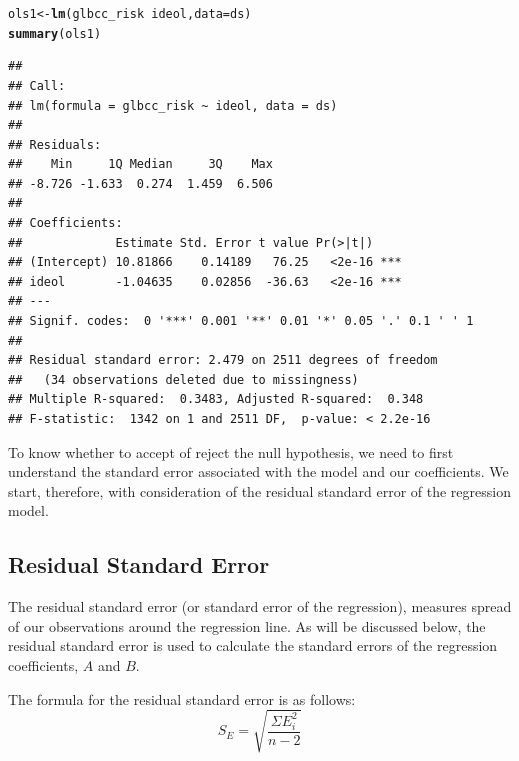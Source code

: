 \documentclass[11pt,openany]{book}\usepackage[]{graphicx}\usepackage[]{color}
\makeatletter
\newcommand{\hlopt}[1]{\textcolor[rgb]{0,0,0}{#1}}%
\newcommand{\hlstd}[1]{\textcolor[rgb]{0.345,0.345,0.345}{#1}}%
\newcommand{\hlkwb}[1]{\textcolor[rgb]{0.69,0.353,0.396}{#1}}%
\newcommand{\hlkwc}[1]{\textcolor[rgb]{0.333,0.667,0.333}{#1}}%
\newcommand{\hlkwd}[1]{\textcolor[rgb]{0.737,0.353,0.396}{\textbf{#1}}}%
\newenvironment{kframe}{%
 \def\at@end@of@kframe{}%
 \ifinner\ifhmode%
  \def\at@end@of@kframe{\end{minipage}}%
  \begin{minipage}{\columnwidth}%
 \fi\fi%
 \def\FrameCommand##1{\hskip\@totalleftmargin \hskip-\fboxsep
 \colorbox{shadecolor}{##1}\hskip-\fboxsep
     \hskip-\linewidth \hskip-\@totalleftmargin \hskip\columnwidth}%
 \MakeFramed {\advance\hsize-\width
   \@totalleftmargin\z@ \linewidth\hsize
   \@setminipage}}%
 {\par\unskip\endMakeFramed%
 \at@end@of@kframe}
\newenvironment{knitrout}{}{} %
\renewenvironment{knitrout}{\begin{singlespace}}{\end{singlespace}}
\makeatother
\begin{document}
\begin{knitrout}
\color{fgcolor}\begin{kframe}
\begin{alltt}
\hlstd{ols1} \hlkwb{<-} \hlkwd{lm}\hlstd{(glbcc_risk} \hlopt{~} \hlstd{ideol,} \hlkwc{data} \hlstd{= ds)}
\hlkwd{summary}\hlstd{(ols1)}
\end{alltt}
\begin{verbatim}
## 
## Call:
## lm(formula = glbcc_risk ~ ideol, data = ds)
## 
## Residuals:
##    Min     1Q Median     3Q    Max 
## -8.726 -1.633  0.274  1.459  6.506 
## 
## Coefficients:
##             Estimate Std. Error t value Pr(>|t|)    
## (Intercept) 10.81866    0.14189   76.25   <2e-16 ***
## ideol       -1.04635    0.02856  -36.63   <2e-16 ***
## ---
## Signif. codes:  0 '***' 0.001 '**' 0.01 '*' 0.05 '.' 0.1 ' ' 1
## 
## Residual standard error: 2.479 on 2511 degrees of freedom
##   (34 observations deleted due to missingness)
## Multiple R-squared:  0.3483,	Adjusted R-squared:  0.348 
## F-statistic:  1342 on 1 and 2511 DF,  p-value: < 2.2e-16
\end{verbatim}
\end{kframe}
\end{knitrout}

To know whether to accept of reject the null hypothesis, we need to first understand the standard error associated with the model and our coefficients. We start, therefore, with  consideration of the residual standard error of the regression model. 

\subsection{Residual Standard Error} 

The residual standard error (or standard error of the regression),  measures spread of our observations around the regression line. As will be discussed below, the residual standard error is used to calculate the standard errors of the regression coefficients, $A$ and $B$. 

The formula for the residual standard error is as follows:
\begin{equation}
S_{E}=\sqrt{\frac{\Sigma E^{2}_{i}}{n-2}}
\end{equation}
\end{document}
